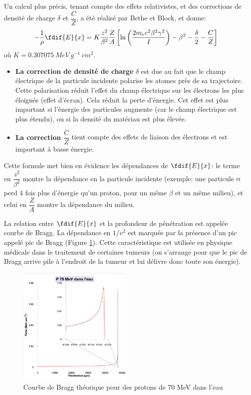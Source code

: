 Un calcul plus précis, tenant compte des effets relativistes, et des corrections de densité de charge $\delta$ et $\dfrac{C}{Z}$, a été réalisé par Bethe et Block, et donne:
\[
    -\dfrac{1}{\rho}\fdif{E}{x} = K\dfrac{z^2}{\beta^2}\dfrac{Z}{A} \left[\ln\left(\dfrac{2m_ec^2\beta^2\gamma^2}{I}\right) - \beta^2-\dfrac{\delta}{2} -\dfrac{C}{Z}\right]
\]
où $K=\SI{0.307075}{MeV~g^{-1}~cm^2}$.

\begin{itemize}[label=$\longrightarrow$]
    \item \textbf{La correction de densité de charge} $\delta$ est due au fait que le champ électrique de la particule incidente polarise les atomes près de sa trajectoire. Cette polarisation réduit l'effet du champ électrique sur les électrons les plus éloignés (effet d'écran). Cela réduit la perte d'énergie. Cet effet est plus important si l'énergie des particules augmente (car le champ électrique est plus étendu), ou si la densité du matériau est plus élevée.
    \item \textbf{La correction $\dfrac{C}{Z}$} tient compte des effets de liaison des électrons et est important à basse énergie.
\end{itemize}

\begin{rem}
    Cette formule met bien en évidence les dépendances de $\fdif{E}{x}$: le terme en $\dfrac{z^2}{\beta^2}$ montre la dépendance en la particule incidente (exemple: une particule $\alpha$ perd 4 fois plus d'énergie qu'un proton, pour un même $\beta$ et un même milieu), et celui en $\dfrac{Z}{A}$ montre la dépendance du milieu.
\end{rem}
\begin{rem}
    La relation entre $\fdif{E}{x}$ et la profondeur de pénétration est appelée courbe de Bragg. La dépendance en $1/v^2$ est marquée par la présence d'un pic appelé pic de Bragg (Figure \ref{fig:pic_bragg}). Cette caractéristique est utilisée en physique médicale dans le traitement de certaines tumeurs (on s'arrange pour que le pic de Bragg arrive pile à l'endroit de la tumeur et lui délivre donc toute son énergie).
\end{rem}

\begin{figure}[H]
    \centering
    \includegraphics[width=0.5\textwidth]{Images1/picbragg.PNG}
    \caption{Courbe de Bragg théorique pour des protons de 70 \si{MeV} dans l'eau}
    \label{fig:pic_bragg}
\end{figure}

